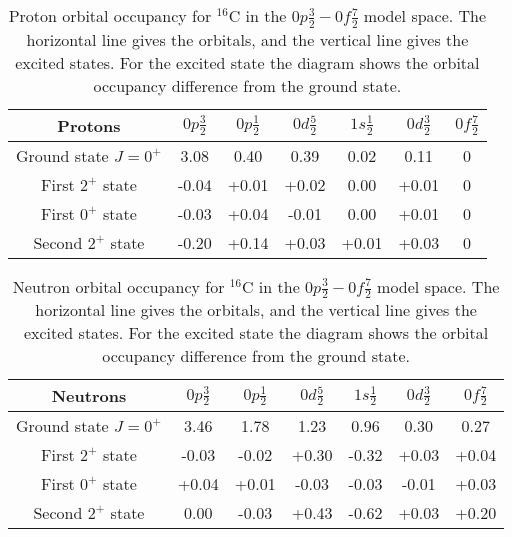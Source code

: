 \begin{table}
\begin{center}
\begin{tabular}{|c|c|c|c|c|c|c|}
	\hline
	Protons & $0p\frac32$ & $0p\frac12$ & $0d\frac52$ & $1s\frac12$ & $0d\frac32$ & $0f\frac72$ \\
	\hline
	Ground state $J=0^+$ & 3.08 & 0.40 & 0.39 & 0.02 & 0.11 & 0 \\
	\hline
	First $2^+$ state & -0.04 & +0.01 & +0.02 & 0.00 & +0.01 & 0 \\
	\hline
	First $0^+$ state & -0.03 & +0.04 & -0.01 & 0.00 & +0.01 & 0 \\
	\hline
	Second $2^+$ state & -0.20 & +0.14 & +0.03 & +0.01 & +0.03 & 0 \\
	\hline
\end{tabular}
\caption{Proton orbital occupancy for $^{16}$C in the $0p\frac32-0f\frac72$ model space. The horizontal line gives the orbitals, and the vertical line gives the excited states. For the excited state the diagram shows the orbital occupancy difference from the ground state.}
\label{C16_0f7_p}
\end{center}
\end{table}

\begin{table}
\begin{center}
\begin{tabular}{|c|c|c|c|c|c|c|}
	\hline
	Neutrons & $0p\frac32$ & $0p\frac12$ & $0d\frac52$ & $1s\frac12$ & $0d\frac32$ & $0f\frac72$ \\
	\hline
	Ground state $J=0^+$ & 3.46 & 1.78 & 1.23 & 0.96 & 0.30 & 0.27 \\
	\hline
	First $2^+$ state & -0.03 & -0.02 & +0.30 & -0.32 & +0.03 & +0.04 \\
	\hline
	First $0^+$ state & +0.04 & +0.01 & -0.03 & -0.03 & -0.01 & +0.03 \\
	\hline
	Second $2^+$ state & 0.00 & -0.03 & +0.43 & -0.62 & +0.03 & +0.20 \\
	\hline
\end{tabular}
\caption{Neutron orbital occupancy for $^{16}$C in the $0p\frac32-0f\frac72$ model space. The horizontal line gives the orbitals, and the vertical line gives the excited states. For the excited state the diagram shows the orbital occupancy difference from the ground state.}
\label{C16_0f7}
\end{center}
\end{table}

\clearpage
